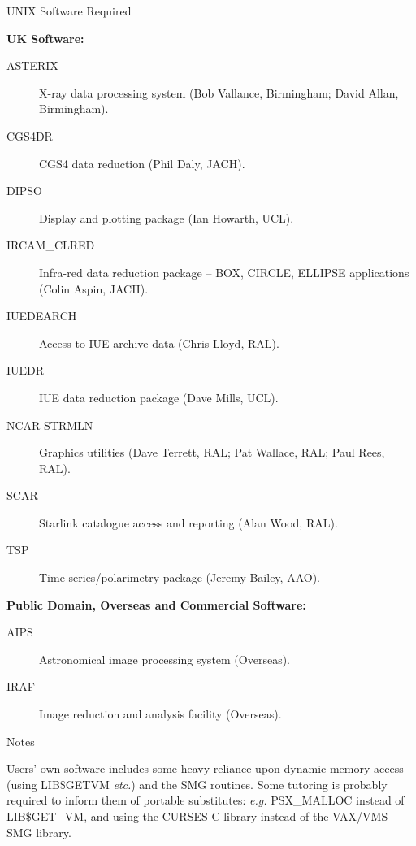 \vspace{5mm}
\begin{center}
{\large\sc UNIX Software Required}
\end{center}

\begin{center}
{\bf UK Software:}
\end{center}

\begin{description}
\item[ASTERIX] X-ray data processing system (Bob Vallance, Birmingham; 
David Allan, Birmingham).
\item[CGS4DR] CGS4 data reduction (Phil Daly, JACH).
\item[DIPSO] Display and plotting package (Ian Howarth, UCL).
\item[IRCAM\_CLRED] Infra-red data reduction package -- BOX, CIRCLE, ELLIPSE 
applications (Colin Aspin, JACH).
\item[IUEDEARCH] Access to IUE archive data (Chris Lloyd, RAL).
\item[IUEDR] IUE data reduction package (Dave Mills, UCL).
\item[NCAR STRMLN] Graphics utilities (Dave Terrett, RAL; Pat Wallace, RAL;
Paul Rees, RAL).
\item[SCAR] Starlink catalogue access and reporting (Alan Wood, RAL).
\item[TSP] Time series/polarimetry package (Jeremy Bailey, AAO).
\end{description}


\vspace{5mm}
\begin{center}
{\bf Public Domain, Overseas and Commercial Software:}
\end{center}

\begin{description}
\item[AIPS] Astronomical image processing system (Overseas).
\item[IRAF] Image reduction and analysis facility (Overseas).
\end{description}


\vspace{5mm}
\begin{center}
{\large\sc Notes}
\end{center}

Users' own software includes some heavy reliance upon dynamic memory access
(using LIB\$GETVM {\em etc.}) and the SMG routines.
Some tutoring is probably required to inform them of portable substitutes:
{\em e.g.} PSX\_MALLOC instead of LIB\$GET\_VM, and using the CURSES C library
instead of the VAX/VMS SMG library.

